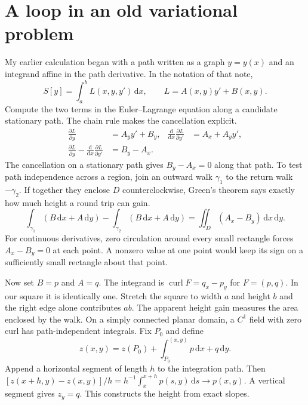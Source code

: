 \documentclass[11pt,a4paper]{article}
\numberwithin{equation}{section}
\newcommand{\dd}{\mathrm{d}}
\DeclareMathOperator{\Curl}{curl}
\begin{document}
\newpage
\section{A loop in an old variational problem}

My earlier calculation began with a path written as a graph $y=y(x)$ and
an integrand affine in the path derivative. In the notation of that note,
\begin{equation}
 S[y]=\int_a^b L(x,y,y')\,\dd x,\qquad L=A(x,y)y'+B(x,y).
\end{equation}
Compute the two terms in the Euler--Lagrange equation along a candidate
stationary path. The chain rule makes the cancellation explicit.
\begin{align}
 \frac{\partial L}{\partial y}&=A_y y'+B_y,&
 \frac{\dd}{\dd x}\frac{\partial L}{\partial y'}&=A_x+A_y y',\nonumber\\
 \frac{\partial L}{\partial y}
      -\frac{\dd}{\dd x}\frac{\partial L}{\partial y'}&=B_y-A_x .
 \label{eq:old}
\end{align}
The cancellation on a stationary path gives $B_y-A_x=0$ along that
path. To test path independence across a region, join an outward walk
$\gamma_1$ to the return walk $-\gamma_2$. If together they enclose $D$
counterclockwise, Green's theorem says exactly how much height a round
trip can gain.
\begin{equation}
 \int_{\gamma_1}(B\,\dd x+A\,\dd y)-\int_{\gamma_2}(B\,\dd x+A\,\dd y)
      =\iint_D(A_x-B_y)\,\dd x\,\dd y .
 \label{eq:green}
\end{equation}
For continuous derivatives, zero circulation around every small rectangle
forces $A_x-B_y=0$ at each point. A nonzero value at one point would keep
its sign on a sufficiently small rectangle about that point.

Now set $B=p$ and $A=q$. The integrand is $\Curl F=q_x-p_y$ for
$F=(p,q)$. In our square it is identically one. Stretch the square
to width $a$ and height $b$ and the right edge alone contributes $ab$.
The apparent height gain measures the area enclosed by the walk.
On a simply connected planar domain, a $C^1$ field
with zero curl has path-independent integrals. Fix $P_0$ and define
\begin{equation}
 z(x,y)=z(P_0)+\int_{P_0}^{(x,y)}p\,\dd x+q\,\dd y .
 \label{eq:potential}
\end{equation}
Append a horizontal segment of length $h$ to the integration path. Then
$[z(x+h,y)-z(x,y)]/h=h^{-1}\int_x^{x+h}p(s,y)\,\dd s\to p(x,y)$.
A vertical segment gives $z_y=q$. This constructs the height from exact slopes.
\end{document}
